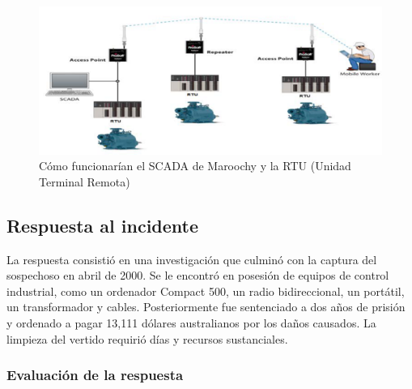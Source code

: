     

\begin{figure}[htbp]
    \centering
    \includegraphics{images/maroochyScada.png}
    \caption{Cómo funcionarían el SCADA de Maroochy y la RTU (Unidad Terminal Remota)}
    \label{fig:maroochyScada}
\end{figure}


\newpage

\subsection{Respuesta al incidente}
La respuesta consistió en una investigación que culminó con la captura del sospechoso en abril de 2000. Se le encontró en posesión de equipos de control industrial, como un ordenador Compact 500, un radio bidireccional, un portátil, un transformador y cables. Posteriormente fue sentenciado a dos años de prisión y ordenado a pagar 13,111 dólares australianos por los daños causados. La limpieza del vertido requirió días y recursos sustanciales.

\subsubsection{Evaluación de la respuesta}

